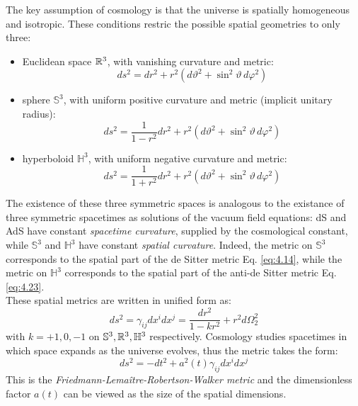The key assumption of cosmology is that the universe is spatially homogeneous and isotropic. These conditions restric the possible spatial geometries to only three:
\begin{itemize}
  \item Euclidean space $ \mathbb{R}^3 $, with vanishing curvature and metric:
    \begin{equation*}
      ds^2 = dr^2 + r^2 \left( d\vartheta^2 + \sin^2 \vartheta\, d\varphi^2 \right)
    \end{equation*}
  \item sphere $ \mathbb{S}^3 $, with uniform positive curvature and metric (implicit unitary radius):
    \begin{equation*}
      ds^2 = \frac{1}{1 - r^2} dr^2 + r^2 \left( d\vartheta^2 + \sin^2 \vartheta\, d\varphi^2 \right)
    \end{equation*}
  \item hyperboloid $ \mathbb{H}^3 $, with uniform negative curvature and metric:
    \begin{equation*}
      ds^2 = \frac{1}{1 + r^2} dr^2 + r^2 \left( d\vartheta^2 + \sin^2 \vartheta\, d\varphi^2 \right)
    \end{equation*}
\end{itemize}
The existence of these three symmetric spaces is analogous to the existance of three symmetric spacetimes as solutions of the vacuum field equations: dS and AdS have constant \textit{spacetime curvature}, supplied by the cosmological constant, while $ \mathbb{S}^3 $ and $ \mathbb{H}^3 $ have constant \textit{spatial curvature}. Indeed, the metric on $ \mathbb{S}^3 $ corresponds to the spatial part of the de Sitter metric Eq. \ref{eq:4.14}, while the metric on $ \mathbb{H}^3 $ corresponds to the spatial part of the anti-de Sitter metric Eq. \ref{eq:4.23}.\\
These spatial metrics are written in unified form as:
\begin{equation}
  ds^2 = \gamma_{ij} dx^i dx^j = \frac{dr^2}{1 - kr^2} + r^2 d\Omega_2^2
  \label{eq:4.56}
\end{equation}
with $ k = +1,0,-1 $ on $ \mathbb{S}^3, \mathbb{R}^3, \mathbb{H}^3 $ respectively. Cosmology studies spacetimes in which space expands as the universe evolves, thus the metric takes the form:
\begin{equation}
  ds^2 = - dt^2 + a^2(t) \gamma_{ij} dx^i dx^j
  \label{eq:4.57}
\end{equation}
This is the \textit{Friedmann-Lemaître-Robertson-Walker metric} and the dimensionless factor $ a(t) $ can be viewed as the size of the spatial dimensions.

